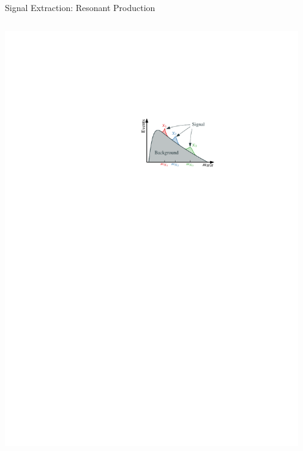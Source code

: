 \documentclass[11pt, xcolor={dvipsnames}, aspectratio=169]{beamer}
\begin{document}
\begin{frame}{Signal Extraction: Resonant \allbold{\HH} Production}
\begin{columns}[onlytextwidth]
    \includegraphics[width=0.95\textwidth]{resonant_signal_extraction_illustration}
  \end{columns}
\end{frame}

\end{document}
